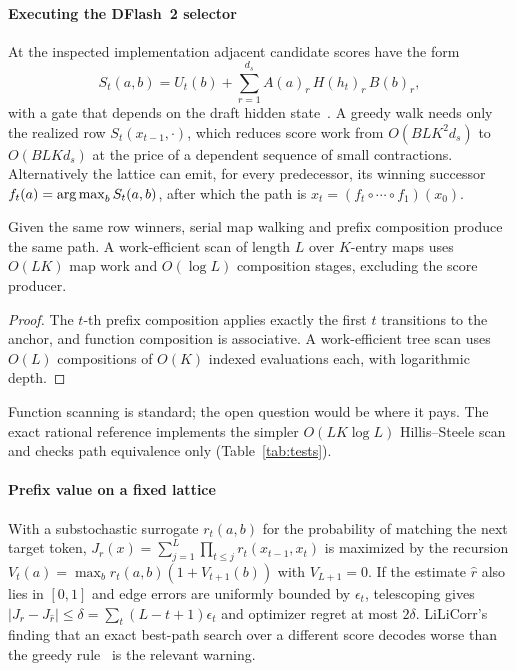 \paragraph{Executing the DFlash~2 selector} At the inspected implementation adjacent candidate scores have the form
\begin{equation}
S_t(a,b)=U_t(b)+\sum_{r=1}^{d_s}A(a)_r\,H(h_t)_r\,B(b)_r,\label{eq:selector}
\end{equation}
with a gate that depends on the draft hidden state~\cite{dflash,sgcode}. A greedy walk needs only the realized row $S_t(x_{t-1},\cdot)$, which reduces score work from $O(BLK^2d_s)$ to $O(BLKd_s)$ at the price of a dependent sequence of small contractions. Alternatively the lattice can emit, for every predecessor, its winning successor $f_t(a)=\operatorname*{arg\,max}_bS_t(a,b)$, after which the path is $x_t=(f_t\circ\cdots\circ f_1)(x_0)$.
\begin{proposition}\label{prop:maps}
Given the same row winners, serial map walking and prefix composition produce the same path. A work-efficient scan of length $L$ over $K$-entry maps uses $O(LK)$ map work and $O(\log L)$ composition stages, excluding the score producer.
\end{proposition}
\begin{proof}
The $t$-th prefix composition applies exactly the first $t$ transitions to the anchor, and function composition is associative. A work-efficient tree scan uses $O(L)$ compositions of $O(K)$ indexed evaluations each, with logarithmic depth.
\end{proof}
Function scanning is standard; the open question would be where it pays. The exact rational reference implements the simpler $O(LK\log L)$ Hillis--Steele scan and checks path equivalence only (Table~\ref{tab:tests}).

\paragraph{Prefix value on a fixed lattice} With a substochastic surrogate $r_t(a,b)$ for the probability of matching the next target token, $J_r(x)=\sum_{j=1}^{L}\prod_{t\le j}r_t(x_{t-1},x_t)$ is maximized by the recursion $V_t(a)=\max_br_t(a,b)(1+V_{t+1}(b))$ with $V_{L+1}=0$. If the estimate $\hat r$ also lies in $[0,1]$ and edge errors are uniformly bounded by $\epsilon_t$, telescoping gives $|J_r-J_{\hat r}|\le\delta=\sum_t(L-t+1)\epsilon_t$ and optimizer regret at most $2\delta$. LiLiCorr's finding that an exact best-path search over a different score decodes worse than the greedy rule~\cite{lilicorr} is the relevant warning.

